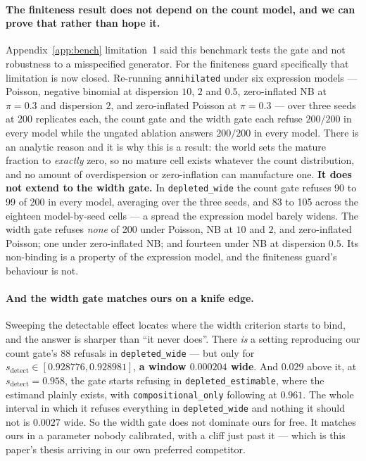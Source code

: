 \paragraph{The finiteness result does not depend on the count model, and we can
prove that rather than hope it.} Appendix~\ref{app:bench} limitation~1 said this
benchmark tests the gate and not robustness to a misspecified generator. For the
finiteness guard specifically that limitation is now closed. Re-running
\texttt{annihilated} under six expression models --- Poisson, negative binomial
at dispersion $10$, $2$ and $0.5$, zero-inflated NB at $\pi = 0.3$ and
dispersion $2$, and zero-inflated Poisson at $\pi = 0.3$ --- over three seeds
at 200 replicates each, the count gate and the width gate each refuse $200/200$
in every model while the ungated ablation answers $200/200$ in every model.
There is an analytic reason and it is why this is a result: the world sets the
mature fraction to \emph{exactly} zero, so no mature cell exists whatever the
count distribution, and no amount of overdispersion or zero-inflation can
manufacture one. \textbf{It does not extend to the width gate.} In
\texttt{depleted\_wide} the count gate refuses 90 to 99 of 200 in every model,
averaging over the three seeds, and 83 to 105 across the eighteen
model-by-seed cells --- a spread the expression model barely widens. The width
gate refuses \emph{none} of 200 under Poisson, NB at $10$ and $2$, and
zero-inflated Poisson; one under zero-inflated NB; and fourteen under NB at
dispersion $0.5$. Its non-binding is a property of the expression model, and
the finiteness guard's behaviour is not.

\paragraph{And the width gate matches ours on a knife edge.} Sweeping the
detectable effect locates where the width criterion starts to bind, and the
answer is sharper than ``it never does''. There \emph{is} a setting reproducing
our count gate's 88 refusals in \texttt{depleted\_wide} --- but only for
$s_{\text{detect}} \in [0.928776, 0.928981]$, \textbf{a window $0.000204$
wide}. And $0.029$ above it, at $s_{\text{detect}} = 0.958$, the gate starts
refusing in \texttt{depleted\_estimable}, where the estimand plainly exists,
with \texttt{compositional\_only} following at $0.961$. The whole interval in
which it refuses everything in \texttt{depleted\_wide} and nothing it should
not is $0.0027$ wide. So the width gate does not dominate ours for free. It matches ours in a parameter nobody calibrated, with a cliff just past
it --- which is this paper's thesis arriving in our own preferred competitor.

